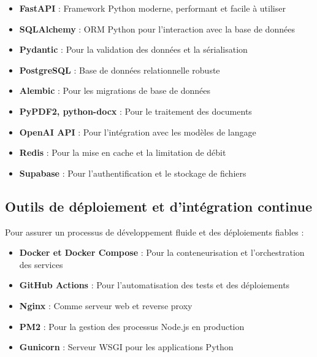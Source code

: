 \begin{itemize}
  \item \textbf{FastAPI} : Framework Python moderne, performant et facile à utiliser
  
  \item \textbf{SQLAlchemy} : ORM Python pour l'interaction avec la base de données
  
  \item \textbf{Pydantic} : Pour la validation des données et la sérialisation
  
  \item \textbf{PostgreSQL} : Base de données relationnelle robuste
  
  \item \textbf{Alembic} : Pour les migrations de base de données
  
  \item \textbf{PyPDF2, python-docx} : Pour le traitement des documents
  
  \item \textbf{OpenAI API} : Pour l'intégration avec les modèles de langage
  
  \item \textbf{Redis} : Pour la mise en cache et la limitation de débit
  
  \item \textbf{Supabase} : Pour l'authentification et le stockage de fichiers
\end{itemize}

\subsection{Outils de déploiement et d'intégration continue}

Pour assurer un processus de développement fluide et des déploiements fiables :

\begin{itemize}
  \item \textbf{Docker et Docker Compose} : Pour la conteneurisation et l'orchestration des services
  
  \item \textbf{GitHub Actions} : Pour l'automatisation des tests et des déploiements
  
  \item \textbf{Nginx} : Comme serveur web et reverse proxy
  
  \item \textbf{PM2} : Pour la gestion des processus Node.js en production
  
  \item \textbf{Gunicorn} : Serveur WSGI pour les applications Python
\end{itemize}

